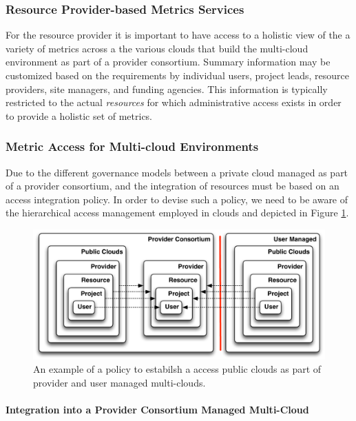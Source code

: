 \documentclass{tex/sig-alternate-2013}
\newcommand{\todo}[1]{{\color{red}{#1}}}
\begin{document}
{\subsubsection{Resource Provider-based Metrics Services} \label{S:resource-metric}

\todo{READ}

For the resource provider it is important to have access to a holistic
view of the a variety of metrics across a the various clouds that
build the multi-cloud environment as part of a provider consortium. 
Summary information may be customized based on the requirements by
individual users, project leads, resource providers, site managers,
and funding agencies. This information is typically restricted to the
actual {\em resources} for which administrative access exists in order
to provide a holistic set of metrics.


\subsubsection{Metric Access for Multi-cloud Environments} 

\todo{READ}

Due to the different governance models between a private cloud managed
as part of a provider consortium, and the integration of resources
must be based on an access integration policy. In order to devise such
a policy, we need to be aware of the hierarchical access management
employed in clouds and depicted in Figure \ref{F:metric-hierarchy}.

\begin{figure}[htb]
  \centering
    \includegraphics[width=1.0\columnwidth]{images/metric-hierarchy.pdf}
  \caption{An example of a policy to estabilsh a access public clouds as part of 
    provider and user managed multi-clouds.}
  \label{F:metric-hierarchy}
\end{figure}

\paragraph{Integration into a Provider Consortium Managed Multi-Cloud}

}
\end{document}
